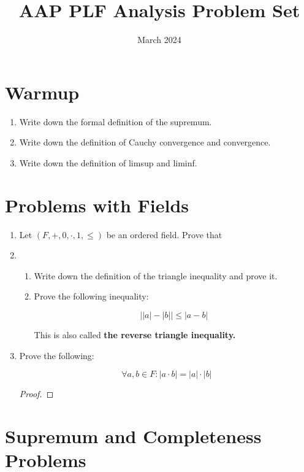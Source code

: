 \documentclass{article}
\title{AAP PLF Analysis Problem Set}
\date{March 2024}
\theoremstyle{definition}
\begin{document}
\maketitle

\section{Warmup}

\begin{enumerate}
    \item Write down the formal definition of the supremum.
    \item Write down the definition of Cauchy convergence and convergence.
    \item Write down the definition of limsup and liminf.
\end{enumerate}

\section{Problems with Fields}

\begin{enumerate}

    \item Let $(F, +, 0, \cdot, 1, \leq) $ be an ordered field. Prove that 

    \item
    \begin{enumerate}
        \item Write down the definition of the triangle inequality and prove it.
        \item Prove the following inequality:

        \[ \lvert \lvert a \rvert - \lvert b \rvert \rvert \leq \lvert a - b \rvert\]
        
        This is also called \textbf{the reverse triangle inequality.}
    \end{enumerate}


    \item Prove the following:

    \[ \forall a,b \in F: \lvert a \cdot b \rvert = \lvert a \rvert \cdot \lvert b \rvert\]

    \begin{proof}
        
    \end{proof}

\end{enumerate}

\section{Supremum and Completeness Problems}
\end{document}
